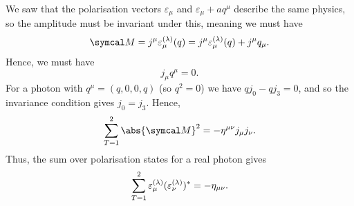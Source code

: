 We saw that the polarisation vectors \(\varepsilon_\mu\) and \(\varepsilon_{\mu} + aq^\mu\) describe the same physics, so the amplitude must be invariant under this, meaning we must have
\begin{equation}
    \amplitude = j^\mu \varepsilon_\mu^{(\lambda)}(q) = j^\mu \varepsilon^{(\lambda)}_\mu(q) + j^\mu q_\mu.
\end{equation}
Hence, we must have
\begin{equation}
    j_\mu q^\mu = 0.
\end{equation}
For a photon with \(q^\mu = (q, 0, 0, q)\) (so \(q^2 = 0\)) we have \(qj_0 - qj_3 = 0\), and so the invariance condition gives \(j_0 = j_3\).
Hence, 
\begin{equation}
    \sum_{T = 1}^{2} \abs{\amplitude}^2 = -\minkowskiMetric^{\mu\nu}j_\mu j_\nu.
\end{equation}
Thus, the sum over polarisation states for a real photon gives
\begin{equation}
    \sum_{T = 1}^{2} \varepsilon^{(\lambda)}_{\mu} (\varepsilon^{(\lambda)}_\nu)^* = -\eta_{\mu\nu}.
\end{equation}

